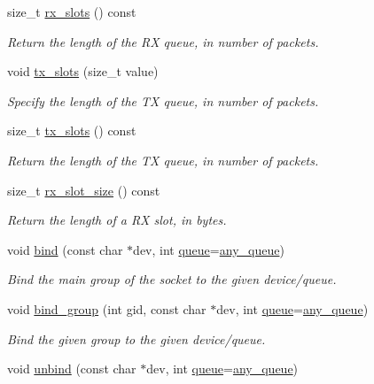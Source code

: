 \begin{DoxyCompactItemize}
size\+\_\+t \hyperlink{classnet_1_1pfq_aa4382e74b5975f81e5b5f676ed0177bb}{rx\+\_\+slots} () const 
\begin{DoxyCompactList}\small\item\em Return the length of the R\+X queue, in number of packets. \end{DoxyCompactList}\item 
void \hyperlink{classnet_1_1pfq_aae98015b961c6210081fa29a2ea34da2}{tx\+\_\+slots} (size\+\_\+t value)
\begin{DoxyCompactList}\small\item\em Specify the length of the T\+X queue, in number of packets. \end{DoxyCompactList}\item 
size\+\_\+t \hyperlink{classnet_1_1pfq_aea6852bcf02bf2430a6a7fe25131c4ab}{tx\+\_\+slots} () const 
\begin{DoxyCompactList}\small\item\em Return the length of the T\+X queue, in number of packets. \end{DoxyCompactList}\item 
size\+\_\+t \hyperlink{classnet_1_1pfq_a8616d3cd53f1a49ff347cc4599e7c04c}{rx\+\_\+slot\+\_\+size} () const 
\begin{DoxyCompactList}\small\item\em Return the length of a R\+X slot, in bytes. \end{DoxyCompactList}\item 
void \hyperlink{classnet_1_1pfq_a3e55b38d9f094ab88c3510c91a3c8ac5}{bind} (const char $\ast$dev, int \hyperlink{classnet_1_1queue}{queue}=\hyperlink{classnet_1_1pfq_a0d4eca6d0925b7c49365675c9cf9385c}{any\+\_\+queue})
\begin{DoxyCompactList}\small\item\em Bind the main group of the socket to the given device/queue. \end{DoxyCompactList}\item 
void \hyperlink{classnet_1_1pfq_a2b8310320db5d583625d67eaae8be047}{bind\+\_\+group} (int gid, const char $\ast$dev, int \hyperlink{classnet_1_1queue}{queue}=\hyperlink{classnet_1_1pfq_a0d4eca6d0925b7c49365675c9cf9385c}{any\+\_\+queue})
\begin{DoxyCompactList}\small\item\em Bind the given group to the given device/queue. \end{DoxyCompactList}\item 
void \hyperlink{classnet_1_1pfq_a769e03c88c5cda30f14e67a7a398aac3}{unbind} (const char $\ast$dev, int \hyperlink{classnet_1_1queue}{queue}=\hyperlink{classnet_1_1pfq_a0d4eca6d0925b7c49365675c9cf9385c}{any\+\_\+queue})

\end{DoxyCompactItemize}
